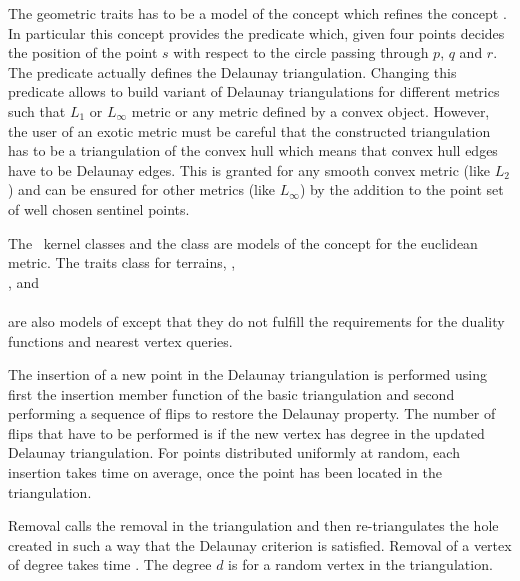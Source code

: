 The geometric traits has to be a model of the concept
which refines the concept .
In particular this concept provides
the  predicate
which, given four points 
 decides the position of  the point $s$  with respect to the circle
passing through $p$, $q$ and $r$. 
The 
predicate actually defines the Delaunay triangulation.
Changing this predicate 
allows to build variant of Delaunay triangulations for different metrics
such that $L_1$ or $L_{\infty}$ metric or any metric defined by a
convex object. However, the user of an exotic metric
must be careful that the constructed triangulation 
has to be a triangulation of the convex hull
which means that convex hull edges have to be Delaunay edges.
This is granted for any smooth convex metric (like $L_2$)
and can be ensured for other metrics (like  $L_{\infty}$)
by the addition to the point set of well chosen sentinel points.

The \cgal\  kernel classes 
 and the class 
are models of the concept 
for the euclidean metric.
The traits class for terrains,
,\\
, and\\
 \\
are also models of  
except that they do not fulfill
the requirements for the duality functions and nearest vertex
queries.

The insertion of a new point in the Delaunay triangulation
is performed using first the insertion member function
of the basic triangulation and second 
performing a sequence of flips to restore the Delaunay property. 
The number of flips that have to be performed is 
if the new vertex has degree  in the updated
Delaunay triangulation. For
points distributed uniformly at random, 
each insertion takes time  on
average, once the point has been located in the triangulation.

Removal calls the removal in the triangulation and then re-triangulates
the hole created in such a way that  the Delaunay criterion is
satisfied. Removal of a
vertex of degree  takes time .
The degree $d$ is  for a random
vertex in the triangulation.

